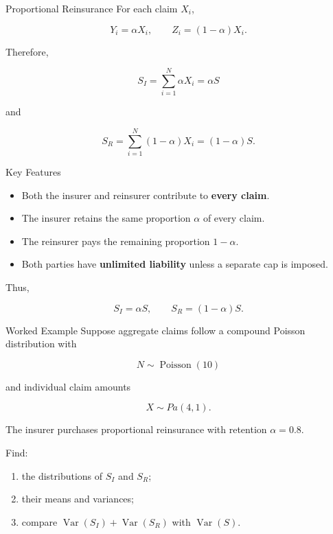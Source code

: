 \documentclass[
  ignorenonframetext,
  aspectratio=169,
]{beamer}
\providecommand{\tightlist}{%
  \setlength{\itemsep}{0pt}\setlength{\parskip}{0pt}}
\begin{document}
\begin{frame}{Proportional Reinsurance}
\protect{}\label{proportional-reinsurance-1}
For each claim \(X_i\),

\[
Y_i=\alpha X_i,
\qquad
Z_i=(1-\alpha)X_i.
\]

Therefore,

\[
S_I=\sum_{i=1}^N\alpha X_i=\alpha S
\]

and

\[
S_R=\sum_{i=1}^N(1-\alpha)X_i=(1-\alpha)S.
\]
\end{frame}

\begin{frame}{Key Features}
\protect{}\label{key-features}
\begin{itemize}
\tightlist
\item
  Both the insurer and reinsurer contribute to \textbf{every claim}.
\item
  The insurer retains the same proportion \(\alpha\) of every claim.
\item
  The reinsurer pays the remaining proportion \(1-\alpha\).
\item
  Both parties have \textbf{unlimited liability} unless a separate cap
  is imposed.
\end{itemize}

Thus,

\[
\boxed{S_I=\alpha S,\qquad S_R=(1-\alpha)S}.
\]
\end{frame}

\begin{frame}{Worked Example}
\protect{}\label{worked-example-1}
Suppose aggregate claims follow a compound Poisson distribution with

\[
N\sim\operatorname{Poisson}(10)
\]

and individual claim amounts

\[
X\sim Pa(4,1).
\]

The insurer purchases proportional reinsurance with retention
\(\alpha=0.8.\)

Find:

\begin{enumerate}
\tightlist
\item
  the distributions of \(S_I\) and \(S_R\);
\item
  their means and variances;
\item
  compare \(\operatorname{Var}(S_I)+\operatorname{Var}(S_R)\) with
  \(\operatorname{Var}(S)\).
\end{enumerate}
\end{frame}
\end{document}
